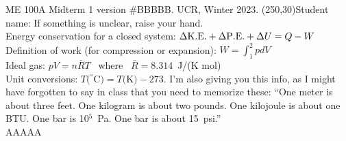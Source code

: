 \documentclass[12pt]{article}
\begin{document}
\setlength{\parindent}{0cm}

ME 100A Midterm 1 version \#BBBBB. UCR, Winter 2023. \framebox(250,30){Student name: \hspace{2.2in}} If something is unclear, raise your hand.\\

Energy conservation for a closed system: $\Delta {\rm K.E.} + \Delta {\rm P.E.} + \Delta U = Q - W$ \\
Definition of work (for compression or expansion): $W=\int_{1}^{2} p dV$ \\
Ideal gas: $p V = n \bar{R} T$ \ where \  $\bar{R}=8.314$~J/(K mol) \\
Unit conversions: $T(^{\circ} $C$) = T($K$) - 273$.  I'm also giving you this info, as I might have forgotten to say in class that you need to memorize these: ``One meter is about three feet.  One kilogram is about two pounds.  One kilojoule is about one BTU.  One bar is 10$^5$~Pa.  One bar is about 15~psi.''\\

AAAAA
\end{document}
